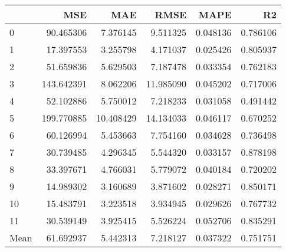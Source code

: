 \begin{tabular}{lrrrrr}
\toprule
 & MSE & MAE & RMSE & MAPE & R2 \\
\midrule
0 & 90.465306 & 7.376145 & 9.511325 & 0.048136 & 0.786106 \\
1 & 17.397553 & 3.255798 & 4.171037 & 0.025426 & 0.805937 \\
2 & 51.659836 & 5.629503 & 7.187478 & 0.033354 & 0.762183 \\
3 & 143.642391 & 8.062206 & 11.985090 & 0.045202 & 0.717006 \\
4 & 52.102886 & 5.750012 & 7.218233 & 0.031058 & 0.491442 \\
5 & 199.770885 & 10.408429 & 14.134033 & 0.046117 & 0.670252 \\
6 & 60.126994 & 5.453663 & 7.754160 & 0.034628 & 0.736498 \\
7 & 30.739485 & 4.296345 & 5.544320 & 0.033157 & 0.878198 \\
8 & 33.397671 & 4.766031 & 5.779072 & 0.040184 & 0.720202 \\
9 & 14.989302 & 3.160689 & 3.871602 & 0.028271 & 0.850171 \\
10 & 15.483791 & 3.223518 & 3.934945 & 0.029626 & 0.767732 \\
11 & 30.539149 & 3.925415 & 5.526224 & 0.052706 & 0.835291 \\
Mean & 61.692937 & 5.442313 & 7.218127 & 0.037322 & 0.751751 \\
\bottomrule
\end{tabular}

